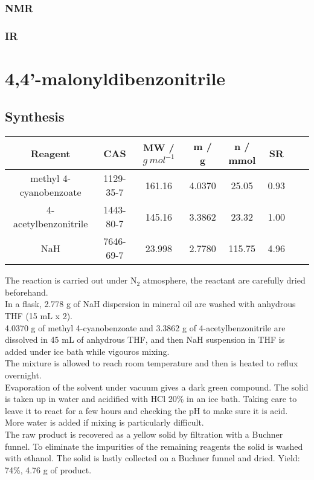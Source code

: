 \documentclass[../Master.tex]{subfiles}
\begin{document}
\subsubsection{NMR}
\subsubsection{IR}
\section{4,4'-malonyldibenzonitrile}
\subsection{Synthesis}
\begin{center}
	\begin{tabular}[b]{cccccccc}
		\toprule
		Reagent                & CAS       & MW / \(g \ mol^{-1}\) & m / g  & n / mmol & SR   \\
		\midrule
		methyl 4-cyanobenzoate & 1129-35-7 & 161.16                & 4.0370 & 25.05    & 0.93 \\
		4-acetylbenzonitrile   & 1443-80-7 & 145.16                & 3.3862 & 23.32    & 1.00 \\
		NaH                    & 7646-69-7 & 23.998                & 2.7780 & 115.75   & 4.96 \\
		\bottomrule
	\end{tabular}
\end{center}
The reaction is carried out under N$_{2}$ atmosphere, the reactant are carefully dried beforehand.\\
In a flask, 2.778 g of NaH dispersion in mineral oil are washed with anhydrous THF (15 mL x 2).\\
4.0370 g of methyl 4-cyanobenzoate and 3.3862 g of 4-acetylbenzonitrile are dissolved in 45 mL of anhydrous THF, and then NaH suspension in THF is added under ice bath while vigouros mixing. \\
The mixture is allowed to reach room temperature and then is heated to reflux overnight. \\
Evaporation of the solvent under vacuum gives a dark green compound. The solid is taken up in water and acidified with HCl 20\% in an ice bath. Taking care to leave it to react for a few hours and checking the pH to make sure it is acid. More water is added if mixing is particularly difficult.\\
The raw product is recovered as a yellow solid by filtration with a Buchner funnel.
To eliminate the impurities of the remaining reagents the solid is washed with ethanol. The solid is lastly collected on a Buchner funnel and dried. Yield: 74\%, 4.76 g of product.
\end{document}
